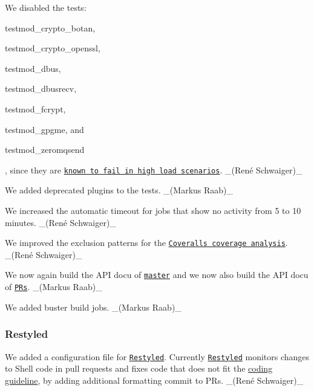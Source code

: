 \begin{DoxyItemize}
\item We disabled the tests\+:
\begin{DoxyItemize}
\item {\ttfamily testmod\+\_\+crypto\+\_\+botan},
\item {\ttfamily testmod\+\_\+crypto\+\_\+openssl},
\item {\ttfamily testmod\+\_\+dbus},
\item {\ttfamily testmod\+\_\+dbusrecv},
\item {\ttfamily testmod\+\_\+fcrypt},
\item {\ttfamily testmod\+\_\+gpgme}, and
\item {\ttfamily testmod\+\_\+zeromqsend}
\end{DoxyItemize}

, since they are \href{https://issues.libelektra.org/2439}{\tt known to fail in high load scenarios}. \+\_\+(René Schwaiger)\+\_\+
\item We added deprecated plugins to the tests. \+\_\+(\+Markus Raab)\+\_\+
\item We increased the automatic timeout for jobs that show no activity from 5 to 10 minutes. \+\_\+(René Schwaiger)\+\_\+
\item We improved the exclusion patterns for the \href{https://coveralls.io/github/ElektraInitiative/libelektra}{\tt Coveralls coverage analysis}. \+\_\+(René Schwaiger)\+\_\+
\item We now again build the A\+PI docu of \href{https://doc.libelektra.org/api/master}{\tt master} and we now also build the A\+PI docu of \href{https://doc.libelektra.org/api/pr/}{\tt P\+Rs}. \+\_\+(\+Markus Raab)\+\_\+
\item We added buster build jobs. \+\_\+(\+Markus Raab)\+\_\+
\end{DoxyItemize}

\subsubsection*{Restyled}


\begin{DoxyItemize}
\item We added a configuration file for \href{https://restyled.io}{\tt Restyled}. Currently \href{https://restyled.io}{\tt Restyled} monitors changes to Shell code in pull requests and fixes code that does not fit the \hyperlink{doc_CODING_md}{coding guideline}, by adding additional formatting commit to P\+Rs. \+\_\+(René Schwaiger)\+\_\+
\end{DoxyItemize}

